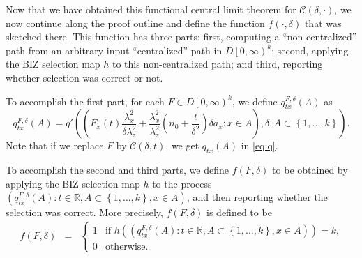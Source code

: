 \documentclass{wscpaperproc}
\theoremstyle{wsc}
\begin{document}
Now that we have obtained this functional central limit theorem for 
$\mathcal{C}\left(\delta,\cdot\right)$, we now continue along the proof outline and define the function $f(\cdot,\delta)$ that was sketched there.
This function has three parts: first, computing a ``non-centralized'' path from an arbitrary input ``centralized'' path in $D\left[0,\infty\right)^{k}$; second, applying the BIZ selection map $h$ to this non-centralized path; and third, reporting whether selection was correct or not.

To accomplish the first part, for each $F\in D\left[0,\infty\right)^{k}$, 
we define $q_{tx}^{F,\delta}\left(A\right)$ as
\[
q_{tx}^{F,\delta}\left(A\right)=q'\left(\left(F_{x}\left(t\right)\frac{\lambda_{x}^{2}}{\delta\lambda_{z}^{2}}+\frac{\lambda_{x}^{2}}{\lambda_{z}^{2}}\left(n_{0}+\frac{t}{\delta^{2}}\right)\delta a_{x}:x\in A\right),\delta,A\subset\left\{ 1,\ldots,k\right\} \right).
\]
Note that if we replace $F$ by $\mathcal{C}\left(\delta,t\right)$,
we get $q_{tx}\left(A\right)$ in \eqref{eq:q}.   

To accomplish the second and third parts, we define
$f\left(F,\delta\right)$ to be obtained by applying the BIZ selection map $h$ to the process
$\left(q_{tx}^{F,\delta}\left(A\right):t\in\mathbb{R},A\subset\left\{ 1,\ldots,k\right\} ,x\in A\right)$, and then reporting whether the selection was correct.
More precisely, $f(F,\delta)$ is defined to be
\begin{eqnarray*}
f\left(F,\delta\right) & = & \begin{cases}
    1 & \text{if $h\left(\left(q_{tx}^{F,\delta}\left(A\right):t\in\mathbb{R},A\subset\left\{ 1,\ldots,k\right\} ,x\in A\right)\right) = k$,}\\
0 & \text{otherwise.}
\end{cases}
\end{eqnarray*}
\end{document}

